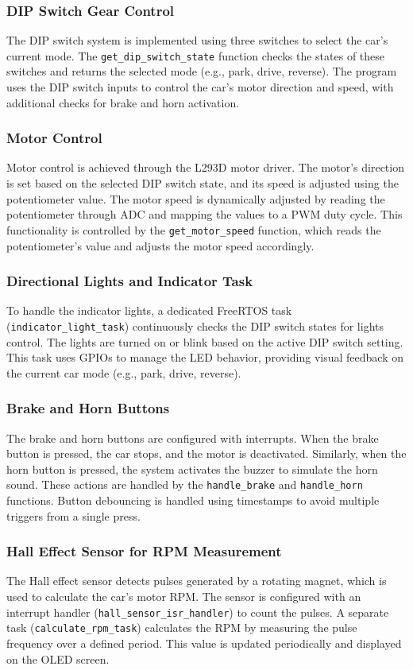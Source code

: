 \subsubsection{DIP Switch Gear Control}
The DIP switch system is implemented using three switches to select the car's current mode. The \texttt{get\_dip\_switch\_state} function checks the states of these switches and returns the selected mode (e.g., park, drive, reverse). The program uses the DIP switch inputs to control the car's motor direction and speed, with additional checks for brake and horn activation.

\subsubsection{Motor Control}
Motor control is achieved through the L293D motor driver. The motor's direction is set based on the selected DIP switch state, and its speed is adjusted using the potentiometer value. The motor speed is dynamically adjusted by reading the potentiometer through ADC and mapping the values to a PWM duty cycle. This functionality is controlled by the \texttt{get\_motor\_speed} function, which reads the potentiometer's value and adjusts the motor speed accordingly.

\subsubsection{Directional Lights and Indicator Task}
To handle the indicator lights, a dedicated FreeRTOS task (\texttt{indicator\_light\_task}) continuously checks the DIP switch states for lights control. The lights are turned on or blink based on the active DIP switch setting. This task uses GPIOs to manage the LED behavior, providing visual feedback on the current car mode (e.g., park, drive, reverse).

\subsubsection{Brake and Horn Buttons}
The brake and horn buttons are configured with interrupts. When the brake button is pressed, the car stops, and the motor is deactivated. Similarly, when the horn button is pressed, the system activates the buzzer to simulate the horn sound. These actions are handled by the \texttt{handle\_brake} and \texttt{handle\_horn} functions. Button debouncing is handled using timestamps to avoid multiple triggers from a single press.

\subsubsection{Hall Effect Sensor for RPM Measurement}
The Hall effect sensor detects pulses generated by a rotating magnet, which is used to calculate the car's motor RPM. The sensor is configured with an interrupt handler (\texttt{hall\_sensor\_isr\_handler}) to count the pulses. A separate task (\texttt{calculate\_rpm\_task}) calculates the RPM by measuring the pulse frequency over a defined period. This value is updated periodically and displayed on the OLED screen.

